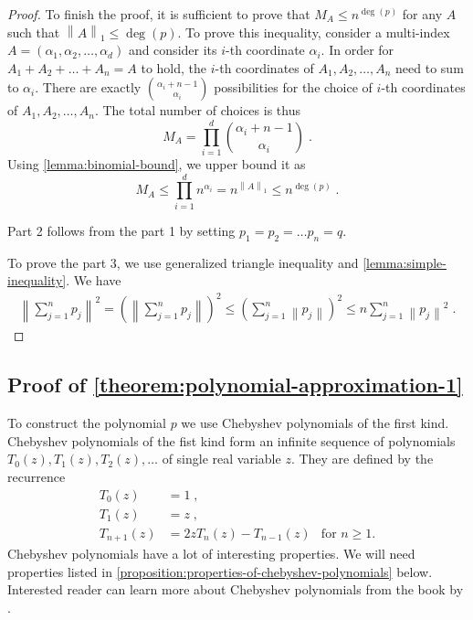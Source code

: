 \documentclass[12pt]{article}
\newcommand{\norm}[1]{\left\| #1 \right\|}  %
\begin{document}
\begin{proof}
To finish the proof, it is sufficient to prove that $M_A \le n^{\deg(p)}$ for
any $A$ such that $\norm{A}_1 \le \deg(p)$. To prove this inequality, consider a
multi-index $A = (\alpha_1, \alpha_2, \dots, \alpha_d)$ and consider its $i$-th coordinate
$\alpha_i$. In order for $A_1 + A_2 + \dots + A_n = A$ to hold, the $i$-th
coordinates of $A_1, A_2, \dots, A_n$ need to sum to $\alpha_i$. There are exactly
$\binom{\alpha_i + n - 1}{\alpha_i}$ possibilities for the choice of $i$-th
coordinates of $A_1, A_2, \dots, A_n$. The total number of choices is thus
$$
M_A = \prod_{i=1}^d \binom{\alpha_i + n - 1}{\alpha_i} \; .
$$
Using \autoref{lemma:binomial-bound}, we upper bound it as
$$
M_A \le \prod_{i=1}^d n^{\alpha_i} = n^{\norm{A}_1} \le n^{\deg(p)} \; .
$$

Part 2 follows from the part 1 by setting $p_1 = p_2 = \dots p_n = q$.

To prove the part 3, we use generalized triangle inequality and
\autoref{lemma:simple-inequality}. We have
\begin{align*}
\norm{\sum_{j=1}^n p_j}^2 = \left( \norm{\sum_{j=1}^n p_j} \right)^2 \le \left(\sum_{j=1}^n \norm{p_j} \right)^2 \le n \sum_{j=1}^n \norm{p_j}^2 \; .
\end{align*}
\end{proof}

\subsection{Proof of \autoref{theorem:polynomial-approximation-1}}
\label{section:proof-of-polynomial-approximation-1}

To construct the polynomial $p$ we use Chebyshev polynomials of the first kind.
Chebyshev polynomials of the fist kind form an infinite sequence of polynomials
$T_0(z), T_1(z), T_2(z), \dots$ of single real variable $z$. They are defined
by the recurrence
\begin{align*}
T_0(z) & = 1 \; , \\
T_1(z) & = z \; , \\
T_{n+1}(z) & = 2zT_n(z) - T_{n-1}(z) & \text{for $n \ge 1$.}
\end{align*}
Chebyshev polynomials have a lot of interesting properties.
We will need properties listed in
\autoref{proposition:properties-of-chebyshev-polynomials} below.
Interested reader can learn more about Chebyshev polynomials
from the book by \cite{Mason-Handscomb-2002}.
\end{document}
